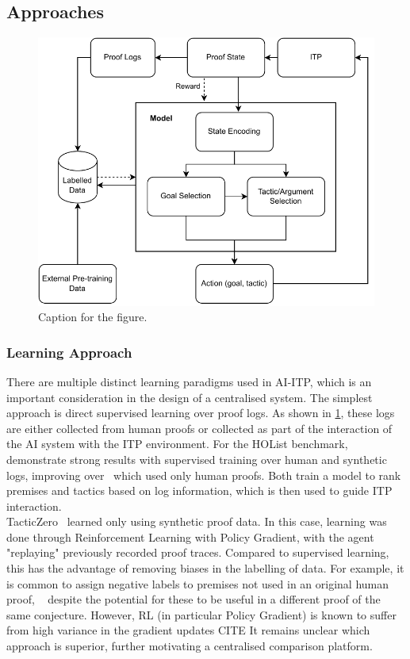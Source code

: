 \documentclass[letterpaper]{article} %
\begin{document}
    \subsection{Approaches}
    \begin{figure}[h]
        \centering
        \includegraphics[width=\linewidth]{AI-ITP}
        \caption{Caption for the figure.}
        \label{fig:ai-itp}
    \end{figure}

    \subsubsection{Learning Approach}
    There are multiple distinct learning paradigms used in AI-ITP, which is an important consideration in the design of a centralised system.
    The simplest approach is direct supervised learning over proof logs.
    As shown in \ref{fig:ai-itp},
    these logs are either collected from human proofs or collected as part of the interaction of the AI system with the ITP environment.
    For the HOList benchmark,~\cite{bansal_learning_2019} demonstrate strong results with supervised training over human and synthetic logs,
    improving over~\cite{paliwal_graph_2019} which used only human proofs.
    Both train a model to rank premises and tactics based on log information, which is then used to guide ITP interaction. \\

    TacticZero~\cite{wu_tacticzero_2021} learned only using synthetic proof data.
    In this case, learning was done through Reinforcement Learning with Policy Gradient,
    with the agent "replaying" previously recorded proof traces.
    Compared to supervised learning, this has the advantage of removing biases in the labelling of data.
    For example, it is common to assign negative labels to premises not used in an original human proof,
    ~\cite{kaliszyk_holstep_2017, kaliszyk_mizar_2015, bansal_holist_2019}
    despite the potential for these to be useful in a different proof of the same conjecture.
    However, RL (in particular Policy Gradient) is known to suffer from high variance in the gradient updates CITE
    It remains unclear which approach is superior, further motivating a centralised comparison platform. \\
\end{document}
